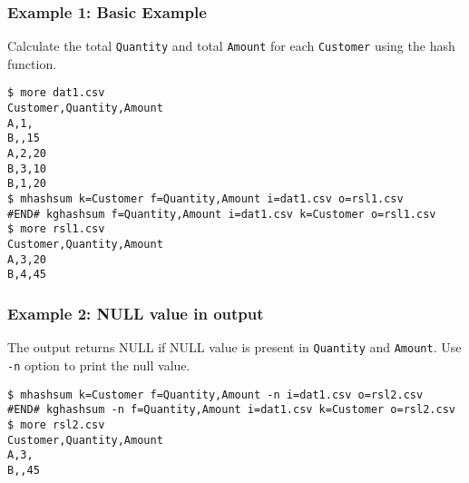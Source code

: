\subsubsection*{Example 1: Basic Example}

Calculate the total \verb|Quantity| and total \verb|Amount| for each \verb|Customer| using the hash function.


\begin{Verbatim}[baselinestretch=0.7,frame=single]
$ more dat1.csv
Customer,Quantity,Amount
A,1,
B,,15
A,2,20
B,3,10
B,1,20
$ mhashsum k=Customer f=Quantity,Amount i=dat1.csv o=rsl1.csv
#END# kghashsum f=Quantity,Amount i=dat1.csv k=Customer o=rsl1.csv
$ more rsl1.csv
Customer,Quantity,Amount
A,3,20
B,4,45
\end{Verbatim}
\subsubsection*{Example 2: NULL value in output}

The output returns NULL if NULL value is present in \verb|Quantity| and \verb|Amount|. Use \verb|-n| option to print the null value.


\begin{Verbatim}[baselinestretch=0.7,frame=single]
$ mhashsum k=Customer f=Quantity,Amount -n i=dat1.csv o=rsl2.csv
#END# kghashsum -n f=Quantity,Amount i=dat1.csv k=Customer o=rsl2.csv
$ more rsl2.csv
Customer,Quantity,Amount
A,3,
B,,45
\end{Verbatim}
